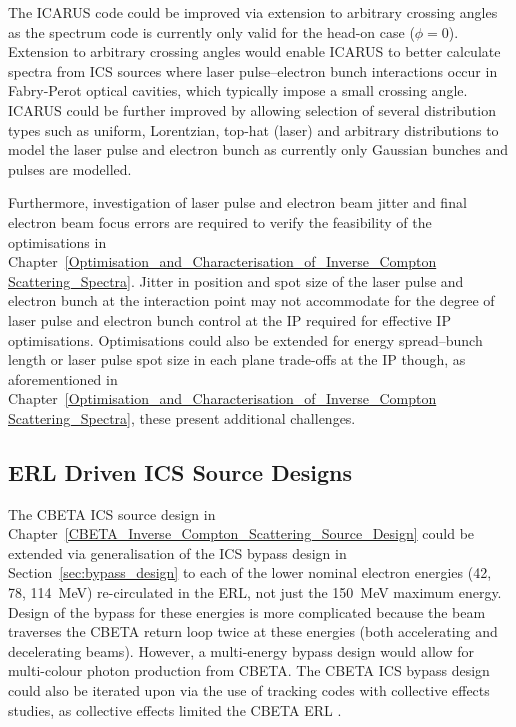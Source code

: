\documentclass[../main.tex]{subfiles}
\begin{document}
The \textsc{ICARUS} code could be improved via extension to arbitrary crossing angles as the spectrum code is currently only valid for the head-on case ($\phi=0$). Extension to arbitrary crossing angles would enable \textsc{ICARUS} to better calculate spectra from ICS sources where laser pulse--electron bunch interactions occur in Fabry-Perot optical cavities, which typically impose a small crossing angle. \textsc{ICARUS} could be further improved by allowing selection of several distribution types such as uniform, Lorentzian, top-hat (laser) and arbitrary distributions to model the laser pulse and electron bunch as currently only Gaussian bunches and pulses are modelled.

Furthermore, investigation of laser pulse and electron beam jitter and final electron beam focus errors are required to verify the feasibility of the optimisations in Chapter~\ref{Optimisation_and_Characterisation_of_Inverse_Compton Scattering_Spectra}. Jitter in position and spot size of the laser pulse and electron bunch at the interaction point may not accommodate for the degree of laser pulse and electron bunch control at the IP required for effective IP optimisations. Optimisations could also be extended for energy spread--bunch length or laser pulse spot size in each plane trade-offs at the IP though, as aforementioned in Chapter~\ref{Optimisation_and_Characterisation_of_Inverse_Compton Scattering_Spectra}, these present additional challenges.   

\subsection{ERL Driven ICS Source Designs}

The CBETA ICS source design in Chapter~\ref{CBETA_Inverse_Compton_Scattering_Source_Design} could be extended via generalisation of the ICS bypass design in Section~\ref{sec:bypass_design} to each of the lower nominal electron energies (42, 78, 114~\si{\mega\electronvolt}) re-circulated in the ERL, not just the 150~\si{\mega\electronvolt} maximum energy. Design of the bypass for these energies is more complicated because the beam traverses the CBETA return loop twice at these energies (both accelerating and decelerating beams). However, a multi-energy bypass design would allow for multi-colour photon production from CBETA. The CBETA ICS bypass design could also be iterated upon via the use of tracking codes with collective effects studies, as collective effects limited the CBETA ERL \cite{lou2019beam,lou2020coherent}.
\end{document}
